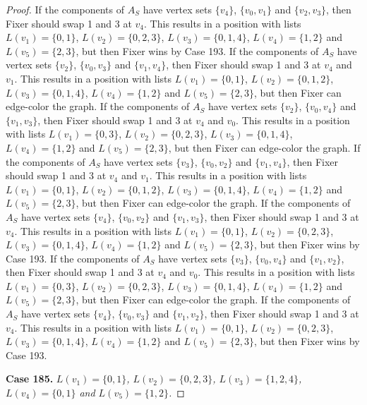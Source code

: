 \documentclass[12pt]{amsart}
\theoremstyle{plain}
\theoremstyle{definition}
\theoremstyle{remark}
\begin{document}
\begin{proof}
If the components of $A_S$ have vertex sets $\{v_4\}$, $\{v_0, v_1\}$ and $\{v_2, v_3\}$, then Fixer should swap 1 and 3 at $v_4$. This results in a position with lists $L(v_1) = \{0, 1\}$, $L(v_2) = \{0, 2, 3\}$, $L(v_3) = \{0, 1, 4\}$, $L(v_4) = \{1, 2\}$ and $L(v_5) = \{2, 3\}$, but then Fixer wins by Case 193.
If the components of $A_S$ have vertex sets $\{v_2\}$, $\{v_0, v_3\}$ and $\{v_1, v_4\}$, then Fixer should swap 1 and 3 at $v_4$ and $v_1$. This results in a position with lists $L(v_1) = \{0, 1\}$, $L(v_2) = \{0, 1, 2\}$, $L(v_3) = \{0, 1, 4\}$, $L(v_4) = \{1, 2\}$ and $L(v_5) = \{2, 3\}$, but then Fixer can edge-color the graph.
If the components of $A_S$ have vertex sets $\{v_2\}$, $\{v_0, v_4\}$ and $\{v_1, v_3\}$, then Fixer should swap 1 and 3 at $v_4$ and $v_0$. This results in a position with lists $L(v_1) = \{0, 3\}$, $L(v_2) = \{0, 2, 3\}$, $L(v_3) = \{0, 1, 4\}$, $L(v_4) = \{1, 2\}$ and $L(v_5) = \{2, 3\}$, but then Fixer can edge-color the graph.
If the components of $A_S$ have vertex sets $\{v_3\}$, $\{v_0, v_2\}$ and $\{v_1, v_4\}$, then Fixer should swap 1 and 3 at $v_4$ and $v_1$. This results in a position with lists $L(v_1) = \{0, 1\}$, $L(v_2) = \{0, 1, 2\}$, $L(v_3) = \{0, 1, 4\}$, $L(v_4) = \{1, 2\}$ and $L(v_5) = \{2, 3\}$, but then Fixer can edge-color the graph.
If the components of $A_S$ have vertex sets $\{v_4\}$, $\{v_0, v_2\}$ and $\{v_1, v_3\}$, then Fixer should swap 1 and 3 at $v_4$. This results in a position with lists $L(v_1) = \{0, 1\}$, $L(v_2) = \{0, 2, 3\}$, $L(v_3) = \{0, 1, 4\}$, $L(v_4) = \{1, 2\}$ and $L(v_5) = \{2, 3\}$, but then Fixer wins by Case 193.
If the components of $A_S$ have vertex sets $\{v_3\}$, $\{v_0, v_4\}$ and $\{v_1, v_2\}$, then Fixer should swap 1 and 3 at $v_4$ and $v_0$. This results in a position with lists $L(v_1) = \{0, 3\}$, $L(v_2) = \{0, 2, 3\}$, $L(v_3) = \{0, 1, 4\}$, $L(v_4) = \{1, 2\}$ and $L(v_5) = \{2, 3\}$, but then Fixer can edge-color the graph.
If the components of $A_S$ have vertex sets $\{v_4\}$, $\{v_0, v_3\}$ and $\{v_1, v_2\}$, then Fixer should swap 1 and 3 at $v_4$. This results in a position with lists $L(v_1) = \{0, 1\}$, $L(v_2) = \{0, 2, 3\}$, $L(v_3) = \{0, 1, 4\}$, $L(v_4) = \{1, 2\}$ and $L(v_5) = \{2, 3\}$, but then Fixer wins by Case 193.

\noindent\textbf{Case 185.  }\textit{$L(v_1) = \{0, 1\}$, $L(v_2) = \{0, 2, 3\}$, $L(v_3) = \{1, 2, 4\}$, $L(v_4) = \{0, 1\}$ and $L(v_5) = \{1, 2\}$.}


\end{proof}
\end{document}
